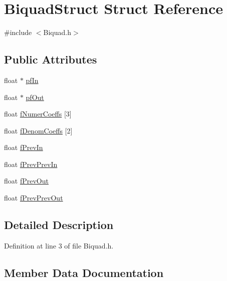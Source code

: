 \hypertarget{struct_biquad_struct}{}\section{Biquad\+Struct Struct Reference}
\label{struct_biquad_struct}


{\ttfamily \#include $<$Biquad.\+h$>$}

\subsection*{Public Attributes}
\begin{DoxyCompactItemize}
\item 
float $\ast$ \hyperlink{struct_biquad_struct_a77ae80d26b2633521dd2bed08e7aae73}{pf\+In}
\item 
float $\ast$ \hyperlink{struct_biquad_struct_ae11f685d35e5164ef2aa9373a78b851a}{pf\+Out}
\item 
float \hyperlink{struct_biquad_struct_ac04e8600119cfdbfc49ac21ea8d176fc}{f\+Numer\+Coeffs} \mbox{[}3\mbox{]}
\item 
float \hyperlink{struct_biquad_struct_ad8bf7510e65e56826667dc1b842c6d9d}{f\+Denom\+Coeffs} \mbox{[}2\mbox{]}
\item 
float \hyperlink{struct_biquad_struct_a3935a6bcf1c59bf9fffd906350769bbd}{f\+Prev\+In}
\item 
float \hyperlink{struct_biquad_struct_a2f3ff0651813fd285796a54473ef9a09}{f\+Prev\+Prev\+In}
\item 
float \hyperlink{struct_biquad_struct_ae206737241cc7a14a4aa0b0d1fa0e3a1}{f\+Prev\+Out}
\item 
float \hyperlink{struct_biquad_struct_a70a7d15cc371455fd9a815539b660b24}{f\+Prev\+Prev\+Out}
\end{DoxyCompactItemize}


\subsection{Detailed Description}


Definition at line 3 of file Biquad.\+h.



\subsection{Member Data Documentation}
